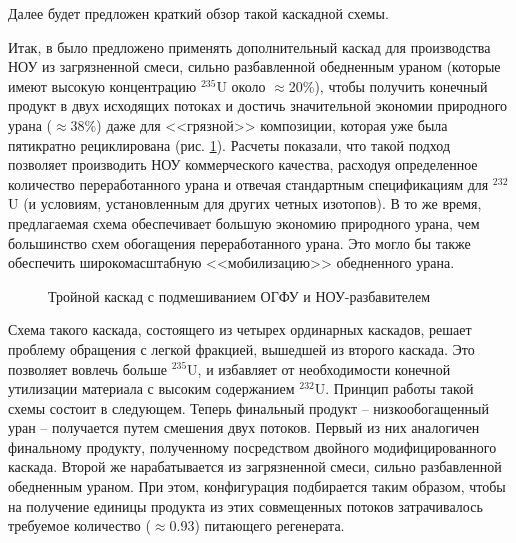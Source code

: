 Далее будет предложен краткий обзор такой каскадной схемы.
 
Итак, в \cite{smirnovMethodEnrichReprocessed2019}  было предложено применять дополнительный каскад для производства НОУ из загрязненной смеси, сильно разбавленной обедненным ураном (которые имеют высокую концентрацию $^{235}$U около $\approx$20\%), чтобы получить конечный продукт в двух исходящих потоках и достичь значительной экономии природного урана ($\approx$38\%) даже для <<грязной>> композиции, которая уже была пятикратно рециклирована (рис. \ref{fig:Tomsk}). Расчеты показали, что такой подход позволяет производить НОУ коммерческого качества, расходуя определенное количество переработанного урана и отвечая стандартным спецификациям для  $^{232}$U (и условиям, установленным для других четных изотопов). В то же время, предлагаемая схема обеспечивает большую экономию природного урана, чем большинство схем обогащения переработанного урана. Это могло бы также обеспечить широкомасштабную <<мобилизацию>> обедненного урана.

\begin{figure}[ht]
  \caption{Тройной каскад с подмешиванием ОГФУ и НОУ-разбавителем}\label{fig:Tomsk}
\end{figure}

Схема такого каскада, состоящего из четырех ординарных каскадов, решает проблему обращения с легкой фракцией, вышедшей из второго каскада.
Это позволяет вовлечь больше $^{235}$U, и избавляет от необходимости конечной утилизации материала с высоким содержанием $^{232}$U.
Принцип работы такой схемы состоит в следующем.
Теперь финальный продукт -- низкообогащенный уран -- получается путем смешения двух потоков.
Первый из них аналогичен финальному продукту, полученному посредством двойного модифицированного каскада.
Второй же нарабатывается из загрязненной смеси, сильно разбавленной обедненным ураном.
При этом, конфигурация подбирается таким образом, чтобы на получение единицы продукта из этих совмещенных потоков затрачивалось требуемое количество ($\approx$0.93) питающего регенерата.

